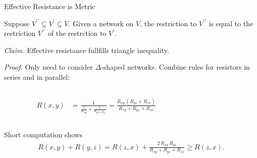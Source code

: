 \begin{frame}{Effective Resistance is Metric}
    \begin{theorem}
        Suppose $V^{\prime\prime} \subsetneq V^{\prime} \subseteq V$. Given a network on $V$, the restriction to $V^{\prime\prime}$ is equal to the restriction $V^{\prime\prime}$ of the restrction to $V^{\prime}$.
    \end{theorem}
    \bigskip
    
    \textit{Claim.} Effective resistance fullfills triangle inequality.
    \bigskip

    \textit{Proof.} Only need to consider $\Delta$-shaped networks. Combine rules for resistors in series and in parallel:

    \begin{columns}[c]
        \begin{column}{.7\textwidth}
            \begin{align*}
                R(x,y) &= \frac{1}{\frac{1}{R_{xy}} + \frac{1}{R_{yz + R_{zx}}}}
                = \frac{R_{xy}\,(R_{yz} + R_{zx})}{R_{xy} + R_{yz} + R_{zx}}
            \end{align*}
        \end{column}

        \begin{column}{.2\textwidth}
            \centering
        \end{column}
    \end{columns}
    
    Short computation shows
    \begin{align*}
        R(x,y) + R(y,z) = R(z,x) + \frac{2\, R_{xy}\, R_{yz}}{R_{xy} + R_{yz} + R_{zx}} \geq R(z,x).
    \end{align*}
    
\end{frame}

